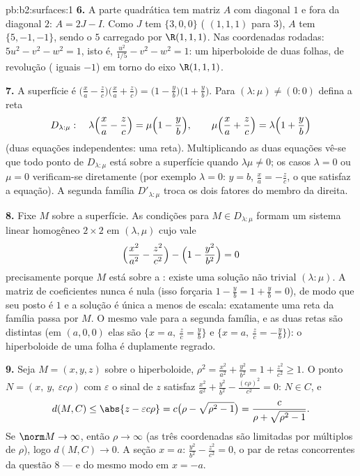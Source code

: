 \begin{solution}{pb:b2:surfaces:1}
\textbf{6.} A parte quadrática tem matriz $A$ com diagonal
$1$ e fora da diagonal $2$: $A = 2J - I$. Como $J$ tem 
$\{3, 0, 0\}$ ( $(1,1,1)$ para $3$), $A$ tem
 $\{5, -1, -1\}$, sendo o  $5$ carregado por
$\R(1,1,1)$. Nas coordenadas rodadas: $5u^2 - v^2 - w^2 =
1$, isto é, $\frac{u^2}{1/5} - v^2 - w^2 = 1$: um hiperboloide de duas
folhas, de revolução ( iguais $-1$) em torno do
eixo $\R(1,1,1)$.

\textbf{7.} A superfície é $\bigl(\frac xa - \frac
zc\bigr)\bigl(\frac xa + \frac zc\bigr) = \bigl(1 - \frac
yb\bigr)\bigl(1 + \frac yb\bigr)$. Para $(\lambda : \mu) \neq
(0:0)$ defina a reta
\[
D_{\lambda:\mu} :\quad
\lambda\Bigl(\frac xa - \frac zc\Bigr) = \mu\Bigl(1 - \frac
yb\Bigr), \qquad
\mu\Bigl(\frac xa + \frac zc\Bigr) = \lambda\Bigl(1 + \frac
yb\Bigr)
\]
(duas equações  independentes: uma reta). Multiplicando as
duas equações vê-se que todo ponto de $D_{\lambda:\mu}$ está
sobre a superfície quando $\lambda\mu \neq 0$; os casos $\lambda = 0$
ou $\mu = 0$ verificam-se diretamente (por exemplo $\lambda = 0$: $y =
b$, $\frac xa = -\frac zc$, o que satisfaz a equação). A
segunda família $D'_{\lambda:\mu}$ troca os dois fatores do
membro da direita.

\textbf{8.} Fixe $M$ sobre a superfície. As condições para $M \in
D_{\lambda:\mu}$ formam um sistema linear homogêneo $2\times2$
em $(\lambda, \mu)$ cujo  vale
\[
\Bigl(\frac{x^2}{a^2} - \frac{z^2}{c^2}\Bigr) - \Bigl(1 -
\frac{y^2}{b^2}\Bigr) = 0
\]
precisamente porque $M$ está sobre a : existe uma solução
não trivial $(\lambda : \mu)$. A matriz de coeficientes nunca é
nula (isso forçaria $1 - \frac yb = 1 + \frac yb =
0$), de modo que seu posto é $1$ e a solução é única a menos de
escala: exatamente uma reta da família passa por $M$.
O mesmo vale para a segunda família, e as duas retas são
distintas (em $(a, 0, 0)$ elas são $\{x = a,\ \frac zc = \frac
yb\}$ e $\{x = a,\ \frac zc = -\frac yb\}$): o hiperboloide
de uma folha é duplamente regrado.

\textbf{9.} Seja $M = (x, y, z)$ sobre o hiperboloide, $\rho^2 =
\frac{x^2}{a^2} + \frac{y^2}{b^2} = 1 + \frac{z^2}{c^2} \geq
1$. O ponto $N = (x,\ y,\ \varepsilon c\rho)$ com
$\varepsilon$ o sinal de $z$ satisfaz $\frac{x^2}{a^2} +
\frac{y^2}{b^2} - \frac{(c\rho)^2}{c^2} = 0$: $N \in C$, e
\[
d(M, C) \leq \abs{z - \varepsilon c\rho}
= c\bigl(\rho - \sqrt{\rho^2 - 1}\bigr)
= \frac{c}{\rho + \sqrt{\rho^2 - 1}} .
\]
Se $\norm M \to \infty$, então $\rho \to \infty$ (as três
coordenadas são limitadas por múltiplos de $\rho$), logo $d(M, C)
\to 0$. A seção $x = a$: $\frac{y^2}{b^2} -
\frac{z^2}{c^2} = 0$, o par de retas concorrentes da questão
8 --- e do mesmo modo em $x = -a$.


\end{solution}
